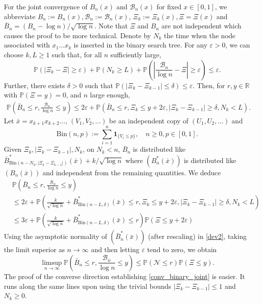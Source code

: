 \documentclass{amsart}       %
\newcommand{\sN}{\mathcal N}
\newcommand{\R}{\ensuremath{\mathbb{R}}}
\newcommand{\Prob}[1]{\ensuremath{\mathbb{P} \left(#1 \right)}}
\newcommand{\I}[1]{\ensuremath{\mathbf{1}_{  #1  }}}
\begin{document}
For the joint convergence of $B_n(x)$ and $\mathcal{B}_n(x)$ for fixed $x \in [0,1]$,  we abbreviate $B_n := B_n(x), \mathcal{B}_n := \mathcal{B}_n(x)$, $\Xi_k := \Xi_k(x), \Xi = \Xi(x)$ and $\bar B_n = (B_n - \log n)/\sqrt{\log n}$. Note that $\Xi$ and $B_n$ are not independent which causes the proof to be more technical. Denote by $N_k$ the time when the node associated with $x_1 \ldots x_k$ is inserted in the binary search tree. For any $\varepsilon > 0$, we can choose $k, L \geq 1$ such that, for all $n$ sufficiently large,
$$\Prob{|\Xi_k - \Xi| \geq \varepsilon} + \Prob{N_k \geq L} + \Prob{\left | \frac{\mathcal{B}_n}{\log n} - \Xi \right| \geq \varepsilon} \leq \varepsilon.$$
Further, there exists $\delta > 0$ such that $\Prob{|\Xi_k - \Xi_{k-1}| \leq \delta} \leq \varepsilon$.
Then, for $r , y  \in \R$ with $\Prob{\Xi = y } = 0$, and $n$ large enough,
\begin{align*}
\Prob{\bar B_n \leq r, \frac{\mathcal{B}_n}{ \log n} \leq y} \leq 2 \varepsilon + \Prob{\bar B_n \leq r, \Xi_k \leq y + 2 \varepsilon, |\Xi_k - \Xi_{k-1}| \geq \delta, N_k < L}.
\end{align*}
Let $\bar x = x_{k+1} x_{k+2} \ldots$, $(V_1, V_2, \ldots)$ be an independent copy of $(U_1, U_2, \ldots)$ and $$\text{Bin}(n,p) := \sum_{i=1}^n \I{\{V_i \leq p\}}, \quad n \geq 0, p \in [0,1].$$
Given $\Xi_k, |\Xi_k - \Xi_{k-1}|, N_k$, on $N_k < n$, $\bar B_n$ is distributed like $\bar B^*_{\text{Bin}(n - N_k, |\Xi_k - \Xi_{k-1}|)}(\bar x)  + k / \sqrt{\log n}$ where $(B^*_n(\bar x))$ is distributed like $(B_n(\bar x))$ and independent from the remaining quantities. We deduce
\begin{align*}
& \Prob{\bar B_n \leq r, \frac{\mathcal{B}_n}{ \log n} \leq y}  \\ & \leq 2 \varepsilon + \Prob{\frac{k}{\sqrt{  \log n}} + \bar B^*_{\text{Bin}(n - L, \delta)}(\bar x) \leq r, \Xi_k \leq y + 2 \varepsilon, |\Xi_k - \Xi_{k-1}| \geq \delta, N_k < L} \\
& \leq  3 \varepsilon + \Prob{\frac{k}{\sqrt{  \log n}} + \bar B^*_{\text{Bin}(n - L, \delta)}(\bar x) \leq r} \Prob{\Xi \leq y + 2 \varepsilon}
\end{align*}
Using the asymptotic normality of $(\bar B_n^*(\bar x))$ (after rescaling) in \eqref{dev2}, taking the limit superior as $n \to \infty$ and then letting $\varepsilon$ tend to zero, we obtain
$$\limsup_{n \to \infty} \Prob{\bar B_n \leq r, \frac{\mathcal{B}_n}{\log n} \leq y} \leq \Prob{\sN \leq r} \Prob{\Xi \leq y}.$$
The proof of the converse direction establishing \eqref{conv_binary_joint} is easier. It runs along the same lines upon using the trivial bounds $|\Xi_k - \Xi_{k-1}| \leq 1$ and $N_k \geq 0$. 
\end{document}
